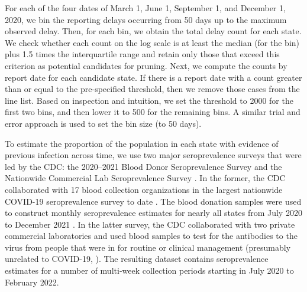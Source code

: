 \documentclass{article}
\begin{document}
For each of the four dates of March 1, June 1, September 1, and %
December 1, 2020, we bin the reporting delays occurring
from 50 days up to the maximum observed delay. Then, for each bin, we obtain
the total delay count for each state. We check whether each count on the
log scale is at least the median (for the bin) plus 1.5 times the
interquartile range and retain only those that exceed this criterion as potential
candidates for pruning. Next, we compute the counts by report date for each
candidate state. If there is a report date with a count greater than or equal to
the pre-specified threshold, then we remove those cases from the line list.
Based on inspection and intuition, we set the threshold to 2000 for the
first two bins, and then lower it to 500 for the remaining bins. 
A similar trial and error approach is used to set the bin size (to 50 days). %

To estimate the proportion of the population in each state with evidence of
previous infection across time, we use two major seroprevalence surveys that
were led by the CDC: the 2020--2021 Blood Donor Seroprevalence Survey and the
Nationwide Commercial Lab Seroprevalence Survey \citep{cdc2021blood,
cdc2021comm}. In the former, the CDC collaborated with 17 blood collection
organizations in the largest nationwide COVID-19 seroprevalence survey to date
\citep{cdc2021blood}. The blood donation samples were used to construct monthly
seroprevalence estimates for nearly all states from July 2020 to December 2021
\citep{jones2021estimated}. In the latter survey, the CDC collaborated with two
private commercial laboratories and used blood samples to test for the
antibodies to the virus from people that were in for routine or clinical
management (presumably unrelated to COVID-19, \citealp{bajema2021estimated}). The
resulting dataset contains seroprevalence estimates for a number of multi-week
collection periods starting in July 2020 to February 2022. 
\end{document}
